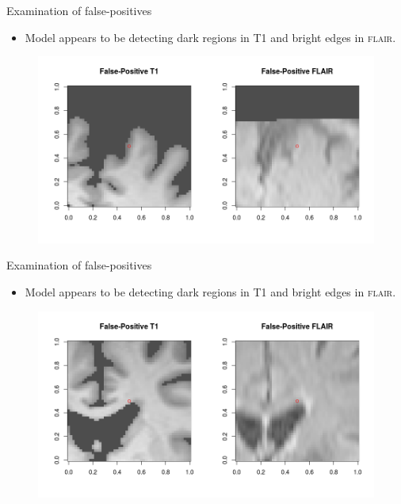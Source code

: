 \documentclass{beamer}
\begin{document}
\begin{frame}{Examination of false-positives}
\begin{itemize}
\item Model appears to be detecting dark regions in T1 and bright edges in \textsc{flair}.
\end{itemize}
\begin{figure}
\centering
\includegraphics[width=\linewidth]{../Thesis_Docs/Images/7_FP_t1_flair.png}
\end{figure}
\end{frame}

\begin{frame}{Examination of false-positives}
\begin{itemize}
\item Model appears to be detecting dark regions in T1 and bright edges in \textsc{flair}.
\end{itemize}
\begin{figure}
\centering
\includegraphics[width=\linewidth]{../Thesis_Docs/Images/7_FP_t1_flair2.png}
\end{figure}
\end{frame}
\end{document}
